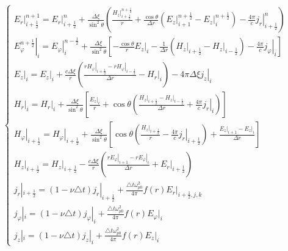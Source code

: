 \documentclass[a4paper]{article}
\begin{document}
	\begin{equation*}
		\begin{cases*}
			\left.E_{r}\right|_{i+\frac{1}{2}}^{n+1}=\left.E_{r}\right|_{i+\frac{1}{2}}^{n}+\frac{\Delta\xi}{\sin^{2}\theta}\left(\frac{\left.H_{z}\right|_{i+\frac{1}{2}}^{n+\frac{1}{2}}}{r}+\frac{\cos\theta}{\Delta r}\left(\left.E_{z}\right|_{i+1}^{n+\frac{1}{2}}-\left.E_{z}\right|_{i}^{n+\frac{1}{2}}\right)-\frac{4\pi}{c}\left.j_{r}\right|_{i+\frac{1}{2}}^{n}\right)\\	\left.E_{\varphi}^{n+\frac{1}{2}}\right|_{i}=\left.E_{\varphi}\right|_{i}^{n-\frac{1}{2}}+\frac{\Delta\xi}{\sin^{2}\theta}\left[-\frac{\cos\theta}{r}\left.E_{z}\right|_{i}-\frac{1}{\Delta r}\left(\left.H_{z}\right|_{i+\frac{1}{2}}-\left.H_{z}\right|_{i-\frac{1}{2}}\right)-\frac{4\pi}{c}\left.j_{\varphi}\right|_{i} \right]\\
			\left.E_{z}\right|_{i}=\left.E_{z}\right|_{i}+\frac{c\Delta\xi}{r}\left(\frac{\left.rH_{\varphi}\right|_{i+\frac{1}{2}}-\left.rH_{\varphi}\right|_{i-\frac{1}{2}}}{\Delta r}-\left.H_{r}\right|_{i}\right)-\left.4\pi\Delta\xi j_{z}\right|_{i}\\
			\left.H_{r}\right|_{i}=\left.H_{r}\right|_{i}+\frac{\Delta\xi}{\sin^{2}\theta}\left[\frac{\left.E_{z}\right|_{i}}{r}+\cos\theta\left(\frac{\left.H_{z}\right|_{i+\frac{1}{2}}-\left.H_{z}\right|_{i-\frac{1}{2}}}{\Delta r}+\frac{4\pi}{c}\left.j_{r}\right|_{i}\right)\right]\\
			\left.H_{\varphi}\right|_{i+\frac{1}{2}}=\left.H_{\varphi}\right|_{i+\frac{1}{2}}+\frac{\Delta\xi}{\sin^{2}\theta}\left[\cos\theta\left(\frac{\left.H_{z}\right|_{i+\frac{1}{2}}}{r}-\frac{4\pi}{c}\left.j_{r}\right|_{i+\frac{1}{2}}\right)+\frac{\left.E_{z}\right|_{i+1}-\left.E_{z}\right|_{i}}{\Delta r}\right]\\
			\left.H_{z}\right|_{i+\frac{1}{2}}=\left.H_{z}\right|_{i+\frac{1}{2}}-\frac{c\Delta\xi}{r}\left(\frac{\left.rE_{\varphi}\right|_{i+1}-\left.rE_{\varphi}\right|_{i}}{\Delta r}+\left.E_{r}\right|_{i+\frac{1}{2}}\right)\\
			j_{r}|_{i+\frac{1}{2}}=(1-\nu\triangle t) j_{r}|_{i+\frac{1}{2}}+\frac{\triangle t\omega_{p0}^{2}}{4\pi} f(r)E_r|_{i+\frac{1}{2},j,k}\\
			j_{\varphi}|_{i}=(1-\nu\triangle t) j_{\varphi}|_{i}+\frac{\triangle t\omega_{p0}^{2}}{4\pi}f(r)E_{\varphi}|_{i}\\
			j_{z}|_{i}=(1-\nu\triangle t) j_{z}|_{i}+\frac{\triangle t\omega_{p0}^{2}}{4\pi}f(r)E_{z}|_{i}
		\end{cases*}
	\end{equation*}
\end{document}
